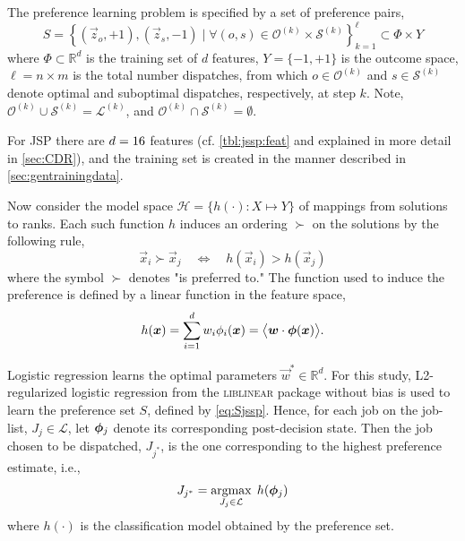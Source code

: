 \documentclass[smallextended]{svjour3}
\begin{document}
The preference learning problem is specified by a set of preference pairs,
\begin{equation}
	S = 
	\left\{\left(\vec{z}_o,+1\right),\left(\vec{z}_s,-1\right)
	\;|\;\forall (o,s) \in \mathcal{O}^{(k)} \times \mathcal{S}^{(k)}
	\right\}_{k=1}^{\ell} \subset \Phi\times Y \label{eq:Sjssp}
\end{equation}
where $\Phi\subset \mathbb{R}^d$ is the training set of $d$ features,  
$Y=\{-1,+1\}$ is the outcome space, $\ell=n\times m$ is the total number 
dispatches, from which $o\in\mathcal{O}^{(k)}$ and $s\in \mathcal{S}^{(k)}$ 
denote optimal and suboptimal dispatches, respectively, at step $k$. 
Note, $\mathcal{O}^{(k)}\cup\mathcal{S}^{(k)}=\mathcal{L}^{(k)}$, and 
$\mathcal{O}^{(k)}\cap\mathcal{S}^{(k)}=\emptyset$. 

For JSP there are $d=16$ features (cf. \cref{tbl:jssp:feat} and 
explained in more detail in \cref{sec:CDR}), and the training set is created in 
the manner described in \cref{sec:gentrainingdata}.

Now consider the model space $\mathcal{H} = \{h(\cdot) : X \mapsto Y\}$ of 
mappings from solutions to ranks. Each such function $h$ induces an ordering 
$\succ$ on the solutions  by the following rule,
\begin{equation}\label{eq:linear}
	\vec{x}_i \succ \vec{x}_j \quad \Leftrightarrow \quad h(\vec{x}_i) > 
	h(\vec{x}_j)
\end{equation}
where the symbol $\succ$ denotes "is preferred to."  The function used to 
induce the preference is defined by a linear function in the feature space,
\begin{equation}\label{eq:jssp:linweights}
	h(\vec{x})=\sum_{i=1}^d w_i\phi_i(\vec{x})=\inner{\vec{w}}{\vphi(\vec{x})}.
\end{equation}

Logistic regression learns the optimal parameters $\vec{w}^*\in\mathbb{R}^d$. 
For this study, L2-regularized logistic regression from the \textsc{liblinear} 
package \cite{liblinear} without bias is used to learn the preference set $S$, 
defined by \cref{eq:Sjssp}.
Hence, for each job on the job-list, $J_j\in\mathcal{L}$, let $\bm{\phi}_j$ denote 
its corresponding  post-decision state. Then the job chosen to be dispatched, 
$J_{j^*}$, is the one corresponding to the highest preference estimate, i.e.,
\begin{equation}\label{eq:lin}
	J_{j^*}=\mathop{\rm argmax}_{J_j\in \mathcal{L}}\; h(\bm{\phi}_j)
\end{equation}
where $h(\cdot)$ is the classification model obtained by the preference set.
\end{document}
